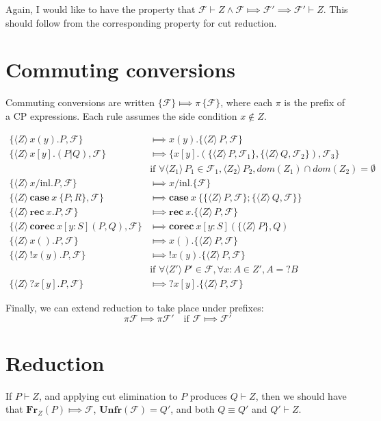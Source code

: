 \documentclass{article}
\newcommand{\unroll}[2]{\mathbf{rec}\:#1.#2}
\newcommand{\roll}[5]{\mathbf{corec}\:#1 [#2:#3] (#4,#5)}
\newcommand{\case}[2]{\mathbf{case}\:#1\:\{#2\}}
\newcommand{\sel}[3]{#1/\mathrm{#2}.#3}
\newcommand{\fragment}[2]{\langle #1 \rangle \, #2}
\def\goesto{\Longmapsto}
\def\F{\mathcal{F}}
\def\Fr{\mathbf{Fr}}
\def\Unfr{\mathbf{Unfr}}
\begin{document}
Again, I would like to have the property that $\F \vdash Z \land \F \goesto \F' \implies \F' \vdash
Z.$ This should follow from the corresponding property for cut reduction.


\section{Commuting conversions}

Commuting conversions are written $\{ \F \} \goesto \pi\,\{\F\}$, where each $\pi$ is the prefix
of a CP expressions.  Each rule assumes the side condition $x \notin Z$.

\begin{align*}
  \{ \fragment{Z}{x(y).P}, \F \} &\goesto x(y).\{\fragment{Z}{P}, \F\} \\
  \{ \fragment{Z}{x[y].(P|Q)}, \F \} &\goesto \{ x[y].(\{\fragment{Z}{P}, \F_1\},\{\fragment{Z}{Q}, \F_2\}),\F_3 \} \\
  & \text{if $\forall \fragment{Z_1}{P_1} \in \F_1,\fragment{Z_2}{P_2},dom(Z_1) \cap dom(Z_2) = \emptyset$} \\
  \{ \fragment{Z}{\sel{x}{inl}{P}}, \F \} &\goesto \sel{x}{inl}{\{\F\}} \\
  \{ \fragment{Z}{\case{x}{P;R}}, \F \} &\goesto \case{x}{\{\fragment{Z}{P},\F\};\{\fragment{Z}{Q},\F\}} \\
  \{ \fragment{Z}{\unroll{x}{P}}, \F \} &\goesto \unroll{x}{\{\fragment{Z}{P}, \F\}} \\
  \{ \fragment{Z}{\roll{x}{y}{S}{P}{Q}}, \F \} &\goesto \roll{x}{y}{S}{\{\fragment{Z}{P}\}}{Q} \\
  \{ \fragment{Z}{x().P}, \F \} &\goesto x().\{\fragment{Z}{P},\F\} \\
  \{ \fragment{Z}{!x(y).P}, \F\} &\goesto !x(y).\{\fragment{Z}{P}, \F\} \\
  &\text{if $\forall \fragment{Z'}{P'} \in \F,\forall x:A \in Z', A = {?B}$} \\
  \{ \fragment{Z}{?x[y].P}, \F\} &\goesto ?x[y].\{\fragment{Z}{P}, \F\}
\end{align*}

Finally, we can extend reduction to take place under prefixes:
\[
  \pi \F \goesto \pi \F' \quad \text{if $\F \goesto \F'$}
\]

\section{Reduction}

If $P \vdash Z$, and applying cut elimination to $P$ produces $Q \vdash Z$, then we should have that
$\Fr_Z(P) \goesto \F$, $\Unfr(\F) = Q'$, and both $Q \equiv Q'$ and $Q' \vdash Z$.
\end{document}
